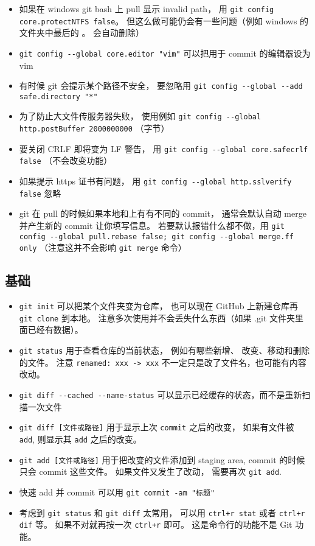 \begin{itemize}
\item 如果在 windows git bash 上 pull 显示 invalid path， 用 \verb`git config core.protectNTFS false`。 但这么做可能仍会有一些问题（例如 windows 的文件夹中最后的 。 会自动删除）
\item \verb`git config --global core.editor "vim"` 可以把用于 commit 的编辑器设为 vim
\item 有时候 git 会提示某个路径不安全， 要忽略用 \verb`git config --global --add safe.directory "*"`
\item 为了防止大文件传服务器失败， 使用例如 \verb`git config --global http.postBuffer 2000000000` （字节）
\item 要关闭 CRLF 即将变为 LF 警告， 用 \verb`git config --global core.safecrlf false` （不会改变功能）
\item 如果提示 https 证书有问题， 用 \verb`git config --global http.sslverify false` 忽略
\item git 在 pull 的时候如果本地和上有有不同的 commit， 通常会默认自动 merge 并产生新的 commit 让你填写信息。 若要默认报错什么都不做，用 \verb`git config --global pull.rebase false; git config --global merge.ff only` （注意这并不会影响 \verb`git merge` 命令）
\end{itemize}

\subsection{基础}
\begin{itemize}
\item \verb`git init` 可以把某个文件夹变为仓库， 也可以现在 GitHub 上新建仓库再 \verb`git clone` 到本地。 注意多次使用并不会丢失什么东西（如果 .git 文件夹里面已经有数据）。
\item \verb`git status` 用于查看仓库的当前状态， 例如有哪些新增、 改变、移动和删除的文件。 注意 \verb`renamed: xxx -> xxx` 不一定只是改了文件名，也可能有内容改动。
\item \verb`git diff --cached --name-status` 可以显示已经缓存的状态，而不是重新扫描一次文件
\item \verb`git diff [文件或路径]` 用于显示上次 \verb`commit` 之后的改变， 如果有文件被 \verb`add`, 则显示其 \verb`add` 之后的改变。
\item \verb`git add [文件或路径]` 用于把改变的文件添加到 staging area, commit 的时候只会 commit 这些文件。 如果文件又发生了改动， 需要再次 \verb`git add`.
\item 快速 add 并 commit 可以用 \verb`git commit -am "标题"`
\item 考虑到 \verb`git status` 和 \verb`git diff` 太常用， 可以用 \verb`ctrl+r stat` 或者 \verb`ctrl+r dif` 等。 如果不对就再按一次 \verb`ctrl+r` 即可。 这是命令行的功能不是 Git 功能。
\end{itemize}

